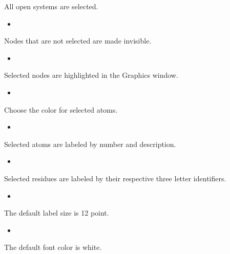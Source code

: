 \documentclass[letterpaper,11pt,english]{sphinxmanual}
\begin{document}
\sphinxAtStartPar
All open systems are selected.
\begin{itemize}
\item {} 
\sphinxAtStartPar
{}

\end{itemize}

\sphinxAtStartPar
Nodes that are not selected are made invisible.
\begin{itemize}
\item {} 
\sphinxAtStartPar
{}

\end{itemize}

\sphinxAtStartPar
Selected nodes are highlighted in the Graphics window.
\begin{itemize}
\item {} 
\sphinxAtStartPar
{}

\end{itemize}

\sphinxAtStartPar
Choose the color for selected atoms.
\begin{itemize}
\item {} 
\sphinxAtStartPar
{}

\end{itemize}

\sphinxAtStartPar
Selected atoms are labeled by number and description.
\begin{itemize}
\item {} 
\sphinxAtStartPar
{}

\end{itemize}

\sphinxAtStartPar
Selected residues are labeled by their respective three letter identifiers.
\begin{itemize}
\item {} 
\sphinxAtStartPar
{}

\end{itemize}

\sphinxAtStartPar
The default label size is 12 point.
\begin{itemize}
\item {} 
\sphinxAtStartPar
{}

\end{itemize}

\sphinxAtStartPar
The default font color is white.
\end{document}
